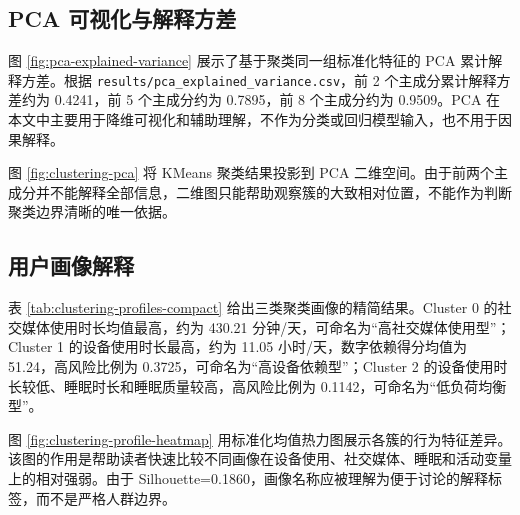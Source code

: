 
\subsection{PCA 可视化与解释方差}

图 \ref{fig:pca-explained-variance} 展示了基于聚类同一组标准化特征的 PCA 累计解释方差。根据 \texttt{results/pca\_explained\_variance.csv}，前 2 个主成分累计解释方差约为 0.4241，前 5 个主成分约为 0.7895，前 8 个主成分约为 0.9509。PCA 在本文中主要用于降维可视化和辅助理解，不作为分类或回归模型输入，也不用于因果解释。


图 \ref{fig:clustering-pca} 将 KMeans 聚类结果投影到 PCA 二维空间。由于前两个主成分并不能解释全部信息，二维图只能帮助观察簇的大致相对位置，不能作为判断聚类边界清晰的唯一依据。


\subsection{用户画像解释}

表 \ref{tab:clustering-profiles-compact} 给出三类聚类画像的精简结果。Cluster 0 的社交媒体使用时长均值最高，约为 430.21 分钟/天，可命名为“高社交媒体使用型”；Cluster 1 的设备使用时长最高，约为 11.05 小时/天，数字依赖得分均值为 51.24，高风险比例为 0.3725，可命名为“高设备依赖型”；Cluster 2 的设备使用时长较低、睡眠时长和睡眠质量较高，高风险比例为 0.1142，可命名为“低负荷均衡型”。



图 \ref{fig:clustering-profile-heatmap} 用标准化均值热力图展示各簇的行为特征差异。该图的作用是帮助读者快速比较不同画像在设备使用、社交媒体、睡眠和活动变量上的相对强弱。由于 Silhouette=0.1860，画像名称应被理解为便于讨论的解释标签，而不是严格人群边界。

